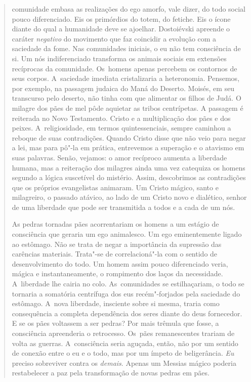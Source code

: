 {\begin{quote}
comunidade embasa as realizações do ego amorfo, vale dizer, do todo
social pouco diferenciado. Eis os primórdios do totem, do fetiche. Eis o
ícone diante do qual a humanidade deve se ajoelhar. Dostoiévski apreende
o caráter \emph{negativo} do movimento que faz coincidir a evolução com
a saciedade da fome. Nas comunidades iniciais, o eu não tem consciência
de si. Um nós indiferenciado transforma os animais sociais em extensões
recíprocas da comunidade. Os~homens apenas percebem os contornos de seus
corpos. A~saciedade imediata cristalizaria a heteronomia. Pensemos, por
exemplo, na passagem judaica do Maná do Deserto. Moisés, em seu
transcurso pelo deserto, não tinha com que alimentar os filhos de Judá.
O milagre dos pães de mel pôde aquietar as tribos centrípetas. A
passagem é reiterada no Novo Testamento. Cristo e a multiplicação dos
pães e dos peixes. A~religiosidade, em termos quintessenciais, sempre
caminhou a reboque de suas contradições. Quando Cristo disse que não
veio para negar a lei, mas para pô"-la em prática, entrevemos a superação
e o atavismo em suas palavras. Senão, vejamos: o amor recíproco aumenta
a liberdade humana, mas a reiteração dos milagres ainda uma vez
catequiza os homens segundo a lógica suscetível do mistério. Assim,
descobrimos as contradições que os próprios evangelistas animaram. Um
Cristo mágico, santo e milagreiro, o passado atávico, ao lado de um
Cristo novo e dialético, senhor de uma liberdade que pode ser
transmitida a todos e a cada de um nós.

As pedras tornadas pães acorrentariam os homens a um estágio de
consciência que geraria um ego animalesco. Um ego eminentemente ligado
ao estômago. Não se trata de negar a importância da supressão das
carências materiais. Trata"-se de correlacioná"-la com o sentido de
desenvolvimento do todo. Um homem assim pouco diferenciado veria, mágica
e instantaneamente, o rompimento dos laços da necessidade. A~liberdade
lhe cairia no colo. As~comunidades se estilhaçariam, o todo se tornaria
a somatória centrífuga dos eus recém"-forjados pela saciedade do
estômago. A~nova liberdade, insciente sobre si mesma, traria como
consequência a completa dependência dos seres diante do deus fornecedor.
E se os pães voltassem a ser pedras? Por mais trêmula que fosse, a
consciência apreenderia o retrocesso. Os~pães remanescentes trariam de
volta as guerras. A~consciência seria aguçada, então, não por um sentido
de conexão entre o eu e o todo, mas por um ímpeto de beligerância.
\emph{Eu} preciso sobreviver contra os \emph{demais}. Apenas um Messias
mágico poderia restabelecer a paz pela transformação de novas pedras em
pães.


\end{quote}}
